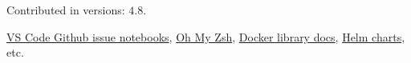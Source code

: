 \documentclass[10pt,a4paper]{article}
\begin{document}
\begin{customitemize}
\begin{customitemize}
        \begin{customitemize}
            \item{Contributed in versions:
                        \href{https://github.com/microsoft/TypeScript/commit/8e6e87fea6463e153822e88431720f846c3b8dfa}{$4.8$}.}
        \end{customitemize}
        \item[] 
        \begin{customitemize}
            \item {
                        \href{https://github.com/microsoft/vscode-github-issue-notebooks/pulls?q=author\%3Ababakks}{VS Code Github issue notebooks},
                        \href{https://github.com/ohmyzsh/ohmyzsh/pulls?q=author\%3Ababakks}{Oh My Zsh},
                        \href{https://github.com/docker-library/docs/pulls?q=author\%3Ababakks}{Docker library docs},
                        \href{https://github.com/helm/charts/pulls?q=author\%3Ababakks}{Helm charts}, etc.
                  }
        \end{customitemize}
    \end{customitemize}


\end{customitemize}
\end{document}

